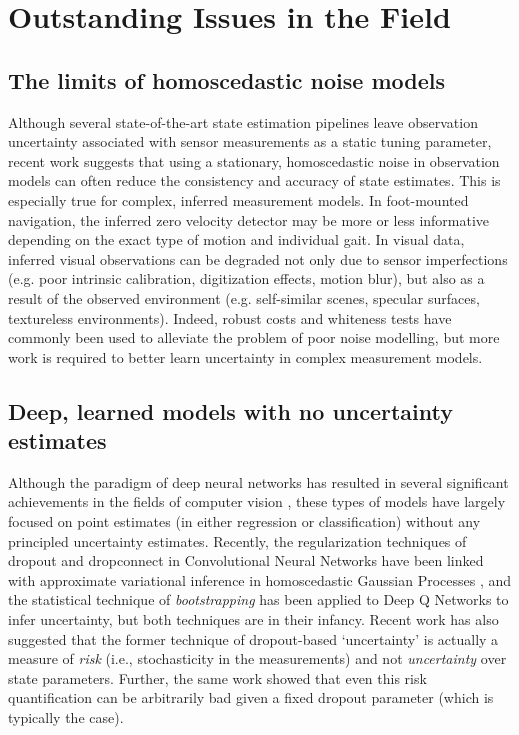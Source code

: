 \section{Outstanding Issues in the Field}

\subsection{The limits of homoscedastic noise models}

Although several state-of-the-art state estimation pipelines  \citep{Leutenegger2015-fk, Cvisic2015-mt} leave observation uncertainty associated with sensor measurements as a static tuning parameter, recent work \citep{Vega-Brown2014-sb, Hu2015-uw} suggests that using a stationary, homoscedastic noise in observation models can often reduce the consistency and accuracy of state estimates. This is especially true for complex, inferred measurement models. In foot-mounted navigation, the inferred zero velocity detector may be more or less informative depending on the exact type of motion and individual gait. In visual data, inferred visual observations can be degraded not only due to sensor imperfections (e.g. poor intrinsic calibration, digitization effects, motion blur), but also as a result of the observed environment (e.g. self-similar scenes, specular surfaces, textureless environments). Indeed, robust costs \cite{Alcantarilla2016-kv, MacTavish2015-wt, Agarwal2013-jq} and whiteness tests \citep{Tsotsos2015-qs} have commonly been used to alleviate the problem of poor noise modelling, but more work is required to better learn uncertainty in complex measurement models.


\subsection{Deep, learned models with no uncertainty estimates}
Although the paradigm of deep neural networks has resulted in several significant achievements in the fields of computer vision \citep{LeCun2015-qf}, these types of models have largely focused on point estimates (in either regression or classification) without any principled uncertainty estimates. Recently, the regularization techniques of dropout and dropconnect in Convolutional Neural Networks have been linked with approximate variational inference in homoscedastic Gaussian Processes \citep{Gal2015-bf, Kendall2016-zf, McClure2016-ai}, and the statistical technique of \textit{bootstrapping} has been applied to Deep Q Networks \citep{Osband2016-jg} to infer uncertainty, but both techniques are in their infancy. Recent work \citep{Osband_undated-wl} has also suggested that the former technique of dropout-based `uncertainty' is actually a measure of \textit{risk} (i.e., stochasticity in the measurements) and not \textit{uncertainty} over state parameters. Further, the same work showed that even this risk quantification can be arbitrarily bad given a fixed dropout parameter (which is typically the case).

